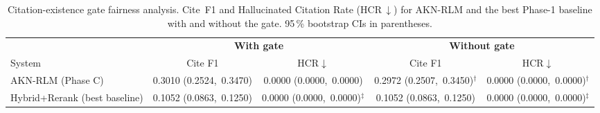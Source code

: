 \begin{table}[htbp]
\centering
\caption{Citation-existence gate fairness analysis. Cite~F1 and Hallucinated Citation Rate
(HCR\,$\downarrow$) for AKN-RLM and the best Phase-1 baseline with and without the gate.
95\,\% bootstrap CIs in parentheses.}
\label{tab:gate_fairness}
\begin{tabular}{lcccc}
\toprule
 & \multicolumn{2}{c}{\textbf{With gate}} & \multicolumn{2}{c}{\textbf{Without gate}} \\
\cmidrule(lr){2-3}\cmidrule(lr){4-5}
System & Cite F1 & HCR$\downarrow$ & Cite F1 & HCR$\downarrow$ \\
\midrule
AKN-RLM (Phase C) & 0.3010 (0.2524,\ 0.3470) & 0.0000 (0.0000,\ 0.0000) & 0.2972 (0.2507,\ 0.3450)$^\dag$ & 0.0000 (0.0000,\ 0.0000)$^\dag$ \\
Hybrid+Rerank (best baseline) & 0.1052 (0.0863,\ 0.1250) & 0.0000 (0.0000,\ 0.0000)$^\ddag$ & 0.1052 (0.0863,\ 0.1250) & 0.0000 (0.0000,\ 0.0000)$^\ddag$ \\
\bottomrule
\end{tabular}
\end{table}
